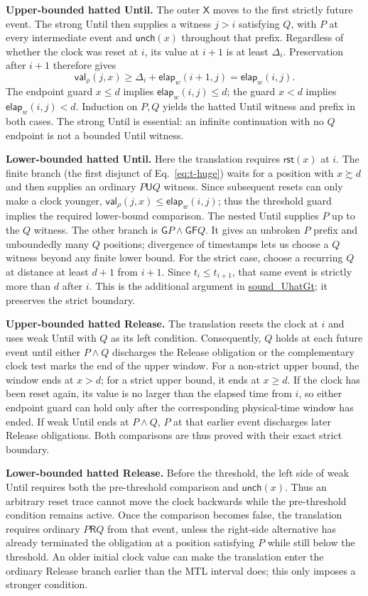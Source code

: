 \documentclass[manuscript]{acmart}
\newcommand{\Until}{\mathbin{\mathsf{U}}}
\newcommand{\Release}{\mathbin{\mathsf{R}}}
\newcommand{\Next}{\mathsf{X}}
\newcommand{\Always}{\mathsf{G}}
\newcommand{\Eventually}{\mathsf{F}}
\providecommand{\Reset}{}\renewcommand{\Reset}{\mathsf{rst}}
\newcommand{\Unch}{\mathsf{unch}}
\newcommand{\CVal}{\mathsf{val}}
\newcommand{\elapsed}{\mathsf{elap}}
\newcommand{\runinhead}[1]{\par\noindent\textbf{#1}\enspace}
\newcommand{\Rocqid}[1]{\url{#1}}
\begin{document}
\runinhead{Upper-bounded hatted Until.}
The outer $\Next$ moves to the first strictly future event. The strong Until
then supplies a witness $j>i$ satisfying $Q$, with $P$ at every intermediate
event and $\Unch(x)$ throughout that prefix. Regardless of whether the clock
was reset at $i$, its value at $i+1$ is at least $\Delta_i$.
Preservation after $i+1$ therefore gives
\[
\CVal_\rho(j,x)\ge
\Delta_i+\elapsed_w(i+1,j)=\elapsed_w(i,j).
\]
The endpoint guard $x\le d$ implies $\elapsed_w(i,j)\le d$; the guard $x<d$
implies $\elapsed_w(i,j)<d$. Induction on $P,Q$ yields the hatted Until
witness and prefix in both cases. The strong Until is essential: an infinite
continuation with no $Q$ endpoint is not a bounded Until witness.

\runinhead{Lower-bounded hatted Until.}
Here the translation requires $\Reset(x)$ at $i$. The finite branch (the first disjunct of
Eq.~\eqref{eq:t-huge}) waits for a position with $x\succsim d$ and then supplies an
ordinary $P\Until Q$ witness. Since subsequent resets can only make a clock
younger, $\CVal_\rho(j,x)\le\elapsed_w(i,j)$; thus the threshold guard implies
the required lower-bound comparison. The nested Until supplies $P$ up to the
$Q$ witness. The other branch is
$\Always P\land\Always\Eventually Q$. It gives an unbroken $P$ prefix and
unboundedly many $Q$ positions; divergence of timestamps lets us choose a
$Q$ witness beyond any finite lower bound. For the strict case, choose a
recurring $Q$ at distance at least $d+1$ from $i+1$. Since
$t_i\le t_{i+1}$, that same event is strictly more than $d$ after $i$. This is
the additional argument in \Rocqid{sound_UhatGt}; it preserves the strict
boundary.

\runinhead{Upper-bounded hatted Release.}
The translation resets the clock at $i$ and uses weak Until with $Q$ as its
left condition. Consequently, $Q$ holds at each future event until either
$P\land Q$ discharges the Release obligation or the complementary clock test
marks the end of the upper window. For a non-strict upper bound, the window
ends at $x>d$; for a strict upper bound, it ends at $x\ge d$. If the clock
has been reset again, its value is no larger than the elapsed time from $i$,
so either endpoint guard can hold only after the corresponding physical-time
window has ended. If weak Until ends at $P\land Q$, $P$ at that earlier event
discharges later Release obligations. Both comparisons are thus proved with
their exact strict boundary.

\runinhead{Lower-bounded hatted Release.}
Before the threshold, the left side of weak Until requires both the
pre-threshold comparison and $\Unch(x)$. Thus an arbitrary reset trace
cannot move the clock backwards while the pre-threshold condition remains
active. Once the comparison becomes false, the translation requires ordinary
$P\Release Q$ from that event, unless the right-side alternative has already
terminated the obligation at a position satisfying $P$ while still below the
threshold. An older initial clock value can make the translation enter the
ordinary Release branch earlier than the MTL interval does; this only imposes
a stronger condition. 
\end{document}
